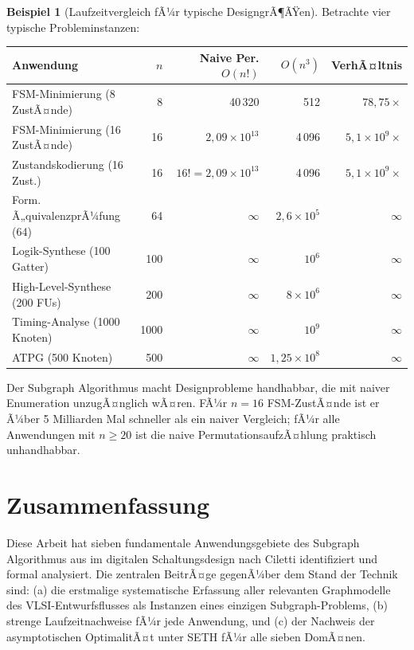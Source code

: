 ﻿\documentclass[a4paper,12pt]{article}
\theoremstyle{definition}
\newtheorem{beispiel}{Beispiel}
\begin{document}
\begin{beispiel}[Laufzeitvergleich fÃ¼r typische DesigngrÃ¶ÃŸen]
  Betrachte vier typische Probleminstanzen:

  \begin{center}
  \begin{tabular}{lrrrr}
    \toprule
    Anwendung & $n$ & Naive Per. $O(n!)$ & $O(n^3)$ & VerhÃ¤ltnis \\
    \midrule
    FSM-Minimierung (8 ZustÃ¤nde) & 8 & 40\,320 & 512 & $78{,}75\times$ \\
    FSM-Minimierung (16 ZustÃ¤nde) & 16 & $2{,}09 \times 10^{13}$ & 4\,096 & $5{,}1 \times 10^{9}\times$ \\
    Zustandskodierung (16 Zust.) & 16 & $16! = 2{,}09 \times 10^{13}$ & 4\,096 & $5{,}1 \times 10^{9}\times$ \\
    Form. Ã„quivalenzprÃ¼fung (64) & 64 & $\infty$ & $2{,}6 \times 10^5$ & $\infty$ \\
    Logik-Synthese (100 Gatter) & 100 & $\infty$ & $10^6$ & $\infty$ \\
    High-Level-Synthese (200 FUs) & 200 & $\infty$ & $8 \times 10^6$ & $\infty$ \\
    Timing-Analyse (1000 Knoten) & 1000 & $\infty$ & $10^9$ & $\infty$ \\
    ATPG (500 Knoten) & 500 & $\infty$ & $1{,}25 \times 10^8$ & $\infty$ \\
    \bottomrule
  \end{tabular}
  \end{center}

  Der Subgraph Algorithmus macht Designprobleme handhabbar, die mit naiver Enumeration
  unzugÃ¤nglich wÃ¤ren. FÃ¼r $n = 16$ FSM-ZustÃ¤nde ist er Ã¼ber 5 Milliarden Mal
  schneller als ein naiver Vergleich; fÃ¼r alle Anwendungen mit $n \geq 20$ ist die
  naive PermutationsaufzÃ¤hlung praktisch unhandhabbar.
\end{beispiel}

\section{Zusammenfassung}

Diese Arbeit hat sieben fundamentale Anwendungsgebiete des Subgraph Algorithmus aus
\cite{subgraph2026} im digitalen Schaltungsdesign nach Ciletti \cite{ciletti2011}
identifiziert und formal analysiert. Die zentralen BeitrÃ¤ge gegenÃ¼ber dem Stand der
Technik sind: (a) die erstmalige systematische Erfassung aller relevanten
Graphmodelle des VLSI-Entwurfsflusses als Instanzen eines einzigen Subgraph-Problems,
(b) strenge Laufzeitnachweise fÃ¼r jede Anwendung, und (c) der Nachweis der
asymptotischen OptimalitÃ¤t unter SETH fÃ¼r alle sieben DomÃ¤nen.
\end{document}
